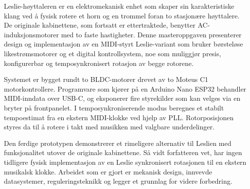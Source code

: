 \noindent Leslie-høyttaleren er en elektromekanisk enhet som skaper sin karakteristiske klang ved å fysisk rotere et horn og en trommel foran to stasjonære høyttalere. De originale kabinettene, som fortsatt er ettertraktede, benytter AC-induksjonsmotorer med to faste hastigheter. Denne masteroppgaven presenterer design og implementasjon av en MIDI-styrt Leslie-variant som bruker børsteløse likestrømsmotorer og et digital kontrollsystem, noe som muliggjør presis, konfigurerbar og temposynkronisert rotasjon av begge rotorene.

\noindent Systemet er bygget rundt to BLDC-motorer drevet av to Moteus C1 motorkontrollere. Programvare som kjører på en Arduino Nano ESP32 behandler MIDI-inndata over USB-C, og eksponerer fire styrekilder som kan velges via en bryter på frontpanelet. I temposynkroniserende modus beregnes et stabilt tempoestimat fra en ekstern MIDI-klokke ved hjelp av PLL. Rotorposisjonen styres da til å rotere i takt med musikken med valgbare underdelinger.

\noindent Den ferdige prototypen demonstrerer et rimeligere alternativ til Leslien med funksjonalitet utover de originale kabinettene. Så vidt forfatteren vet, har ingen tidligere fysisk implementasjon av en Leslie synkronisert rotasjonen til en ekstern musikalsk klokke. Arbeidet som er gjort er mekanisk design, innvevde datasystemer, reguleringsteknikk og legger et grunnlag for videre forbedring.

\clearpage

